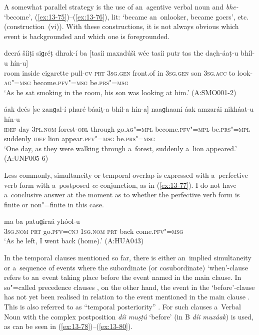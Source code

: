 A somewhat parallel strategy is the use of an~agentive verbal noun and \textit{bhe-} `become', (\ref{ex:13-75})--(\ref{ex:13-76}), lit: `became an~onlooker, became goers', etc. (construction~(vi)). With these constructions, it is not always obvious which event is backgrounded and which one is foregrounded. 

\begin{exe}
\ex
\label{ex:13-75}
\gll deerá šíiṭi siɡréṭ dhrak-í ba [tasíi maxadúši wée tasíi putr tas the dac̣h-áaṭ-u bhíl-u hín-u] \\
room inside cigarette pull-\textsc{cv} \textsc{prt} \textsc{3sg.gen} front.of in \textsc{3sg.gen}  son \textsc{3sg.acc} to look-\textsc{ag"=msg} become.\textsc{pfv"=msg} be.\textsc{prs"=msg}  \\
\glt `As he sat smoking in the room, his son was looking at him.' (A:SMO001-2)

\ex
\label{ex:13-76}
\gll áak deés [se zanɡal-í pharé báaiṭ-a bhíl-a hín-a] naaɡhaaní áak amzarái nikháat-u hín-u \\
\textsc{idef} day \textsc{3pl.nom} forest-\textsc{obl} through go.\textsc{ag"=mpl}  become.\textsc{pfv"=mpl} be.\textsc{prs"=mpl} suddenly \textsc{idef} lion appear.\textsc{pfv"=msg} be.\textsc{prs"=msg}  \\
\glt `One day, as they were walking through a~forest, suddenly a~lion appeared.' (A:UNF005-6) 
\end{exe}

Less commonly, simultaneity or temporal overlap is expressed with a~perfective verb form with a~postposed \textit{ee}-conjunction, as in (\ref{ex:13-77}). I do not have a~conclusive answer at the moment as to whether the perfective verb form is finite or non"=finite in this case.

\begin{exe}
\ex
\label{ex:13-77}
\gll [so ta ɡúum=ee] ma ba patuɡiraá yhóol-u \\
\textsc{3sg.nom} \textsc{prt} go.\textsc{pfv=cnj} \textsc{1sg.nom} \textsc{prt} back  come.\textsc{pfv"=msg} \\
\glt `As he left, I went back (home).' (A:HUA043) 
\end{exe}

 In the temporal clauses mentioned so far, there is either an~implied simultaneity or a~sequence of events where the subordinate (or cosubordinate) `when'-clause refers to an~event taking place before the event named in the main clause. In so"=called precedence clauses \citep[327]{givon2001b}, on the other hand, the event in the `before'-clause has not yet been realised in relation to the event mentioned in the main clause \citep[247--248]{thompsonetal2007}. This is also referred to as ``temporal posteriority'' \citep[159]{cristofaro2005}. For such clauses a~Verbal Noun with the complex postposition \textit{díi muṣṭú} `before' (in B \textit{díi muxáak}) is used, as can be seen in (\ref{ex:13-78})--(\ref{ex:13-80}).

